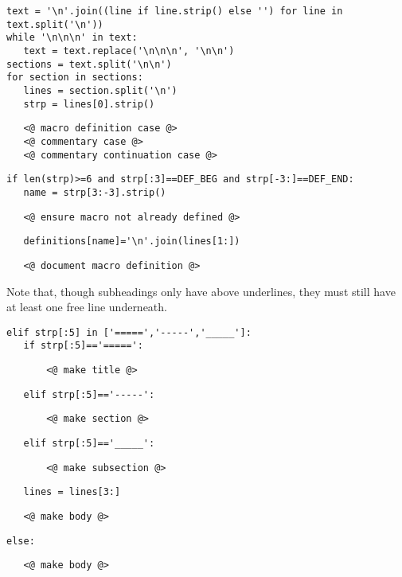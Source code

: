 \documentclass{article}
\begin{document}
{\color{YellowOrange}\begin{verbatim}text = '\n'.join((line if line.strip() else '') for line in text.split('\n'))
while '\n\n\n' in text:
   text = text.replace('\n\n\n', '\n\n')
sections = text.split('\n\n')
for section in sections:
   lines = section.split('\n')
   strp = lines[0].strip()
\end{verbatim}}{\color{MidnightBlue}\begin{verbatim}   <@ macro definition case @>
   <@ commentary case @>
   <@ commentary continuation case @>
\end{verbatim}}
{\color{YellowOrange}\begin{verbatim}if len(strp)>=6 and strp[:3]==DEF_BEG and strp[-3:]==DEF_END:
   name = strp[3:-3].strip()
\end{verbatim}}{\color{MidnightBlue}\begin{verbatim}   <@ ensure macro not already defined @>
\end{verbatim}}
{\color{YellowOrange}\begin{verbatim}   definitions[name]='\n'.join(lines[1:])
\end{verbatim}}{\color{MidnightBlue}\begin{verbatim}   <@ document macro definition @>
\end{verbatim}}
Note that, though subheadings only have above underlines, they must still have
at least one free line underneath.

{\color{YellowOrange}\begin{verbatim}elif strp[:5] in ['=====','-----','_____']:
   if strp[:5]=='=====':
\end{verbatim}}{\color{MidnightBlue}\begin{verbatim}       <@ make title @>
\end{verbatim}}
{\color{YellowOrange}\begin{verbatim}   elif strp[:5]=='-----':
\end{verbatim}}{\color{MidnightBlue}\begin{verbatim}       <@ make section @>
\end{verbatim}}
{\color{YellowOrange}\begin{verbatim}   elif strp[:5]=='_____':
\end{verbatim}}{\color{MidnightBlue}\begin{verbatim}       <@ make subsection @>
\end{verbatim}}
{\color{YellowOrange}\begin{verbatim}   lines = lines[3:]
\end{verbatim}}{\color{MidnightBlue}\begin{verbatim}   <@ make body @>
\end{verbatim}}
{\color{YellowOrange}\begin{verbatim}else:
\end{verbatim}}{\color{MidnightBlue}\begin{verbatim}   <@ make body @>
\end{verbatim}}
\end{document}
